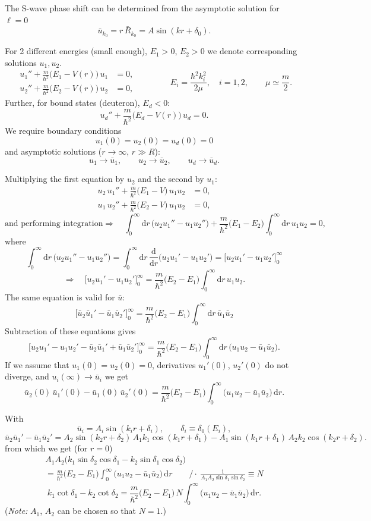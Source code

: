 \documentclass[11pt,a4paper]{article}
\newcommand{\ud}{\mathrm{d}}
\begin{document}
The S-wave phase shift can be determined from the asymptotic solution for $\ell=0$
\[
\bar u_{k_0}=r\,\bar R_{k_0}=A\sin(kr+\delta_0).
\]

For 2 different energies (small enough), $E_1>0$, $E_2>0$ we denote corresponding solutions $u_1, u_2$.
\[
\begin{aligned}
u_1''+\frac{m}{\hbar^2}\big(E_1-V(r)\big)\,u_1&=0,\\
u_2''+\frac{m}{\hbar^2}\big(E_2-V(r)\big)\,u_2&=0,
\end{aligned}
\qquad\qquad
E_i=\frac{\hbar^2k_i^2}{2\mu},\quad i=1,2,\qquad \mu\simeq\frac m2 .
\]
Further, for bound states (deuteron), $E_d<0$:
\[
u_d''+\frac{m}{\hbar^2}\big(E_d-V(r)\big)\,u_d=0 .
\]
We require boundary conditions
\[
u_1(0)=u_2(0)=u_d(0)=0
\]
and asymptotic solutions ($r\to\infty$, $r\gg R$):
\[
u_1\to\bar u_1,\qquad u_2\to\bar u_2,\qquad u_d\to\bar u_d .
\]

Multiplying the first equation by $u_2$ and the second by $u_1$:
\[
\begin{aligned}
u_2\,u_1''+\frac{m}{\hbar^2}\big(E_1-V\big)\,u_1u_2&=0,\\
u_1\,u_2''+\frac{m}{\hbar^2}\big(E_2-V\big)\,u_1u_2&=0,
\end{aligned}
\]
\[
\text{and performing integration} 
\Rightarrow\quad
\int_0^\infty\!\ud r\,\big(u_2u_1''-u_1u_2''\big)
+\frac{m}{\hbar^2}\big(E_1-E_2\big)\int_0^\infty\!\ud r\,u_1u_2=0,
\]
where
\[
\int_0^\infty\!\ud r\,\big(u_2u_1''-u_1u_2''\big)
=\int_0^\infty\!\ud r\,\frac{\ud}{\ud r}\big(u_2u_1'-u_1u_2'\big)
=\Big[u_2u_1'-u_1u_2'\Big]_0^\infty
\]
\[
\Rightarrow\quad
\Big[u_2u_1'-u_1u_2'\Big]_0^\infty=\frac{m}{\hbar^2}\big(E_2-E_1\big)\int_0^\infty\!\ud r\,u_1u_2 .
\]
The same equation is valid for $\bar u$:
\[
\Big[\bar u_2\bar u_1'-\bar u_1\bar u_2'\Big]_0^\infty
=\frac{m}{\hbar^2}\big(E_2-E_1\big)\int_0^\infty\!\ud r\,\bar u_1\bar u_2
\]
Subtraction of these equations gives 
\[
\Big[u_2u_1'-u_1u_2'-\bar u_2\bar u_1'+\bar u_1\bar u_2'\Big]_0^\infty
=\frac{m}{\hbar^2}\big(E_2-E_1\big)\int_0^\infty\!\ud r\,\big(u_1u_2-\bar u_1\bar u_2\big).
\]
If we assume that $u_1(0)=u_2(0)=0$, derivatives $u_1'(0)$, $u_2'(0)$ do not diverge, and $u_i(\infty)\to\bar u_i$ we get 
\[
\bar u_2(0)\,\bar u_1'(0)-\bar u_1(0)\,\bar u_2'(0)
=\frac{m}{\hbar^2}\big(E_2-E_1\big)\int_0^\infty\big(u_1u_2-\bar u_1\bar u_2\big)\,\ud r .
\]

With
\[
\bar u_i=A_i\sin(k_ir+\delta_i),\qquad \delta_i\equiv\delta_0(E_i),
\]
\[
\bar u_2\bar u_1'-\bar u_1\bar u_2'
=A_2\sin(k_2r+\delta_2)\,A_1k_1\cos(k_1r+\delta_1)
-A_1\sin(k_1r+\delta_1)\,A_2k_2\cos(k_2r+\delta_2).
\]
from which we get (for $r=0$)
\begin{multline*}
A_1A_2\big(k_1\sin\delta_2\cos\delta_1-k_2\sin\delta_1\cos\delta_2\big)\\
=\frac{m}{\hbar^2}\big(E_2-E_1\big)\int_0^\infty\big(u_1u_2-\bar u_1\bar u_2\big)\,\ud r
\qquad\Big/\cdot\ \frac{1}{A_1A_2\sin\delta_1\sin\delta_2}\equiv N
\end{multline*}
\[
k_1\cot\delta_1-k_2\cot\delta_2
=\frac{m}{\hbar^2}\big(E_2-E_1\big)\,N\int_0^\infty\big(u_1u_2-\bar u_1\bar u_2\big)\,\ud r .
\]
(\emph{Note:} $A_1$, $A_2$ can be chosen so that $N=1$.)
\end{document}
